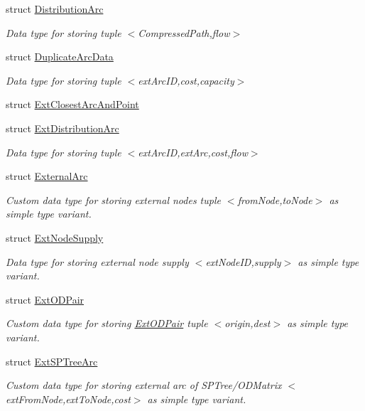 \begin{DoxyCompactItemize}
struct \hyperlink{structnetxpert_1_1data_1_1DistributionArc}{Distribution\+Arc}
\begin{DoxyCompactList}\small\item\em Data type for storing tuple $<$Compressed\+Path,flow$>$ \end{DoxyCompactList}\item 
struct \hyperlink{structnetxpert_1_1data_1_1DuplicateArcData}{Duplicate\+Arc\+Data}
\begin{DoxyCompactList}\small\item\em Data type for storing tuple $<$ext\+Arc\+ID,cost,capacity$>$ \end{DoxyCompactList}\item 
struct \hyperlink{structnetxpert_1_1data_1_1ExtClosestArcAndPoint}{Ext\+Closest\+Arc\+And\+Point}
\item 
struct \hyperlink{structnetxpert_1_1data_1_1ExtDistributionArc}{Ext\+Distribution\+Arc}
\begin{DoxyCompactList}\small\item\em Data type for storing tuple $<$ext\+Arc\+ID,ext\+Arc,cost,flow$>$ \end{DoxyCompactList}\item 
struct \hyperlink{structnetxpert_1_1data_1_1ExternalArc}{External\+Arc}
\begin{DoxyCompactList}\small\item\em Custom data type for storing external nodes tuple $<$from\+Node,to\+Node$>$ as simple type variant. \end{DoxyCompactList}\item 
struct \hyperlink{structnetxpert_1_1data_1_1ExtNodeSupply}{Ext\+Node\+Supply}
\begin{DoxyCompactList}\small\item\em Data type for storing external node supply $<$ext\+Node\+ID,supply$>$ as simple type variant. \end{DoxyCompactList}\item 
struct \hyperlink{structnetxpert_1_1data_1_1ExtODPair}{Ext\+O\+D\+Pair}
\begin{DoxyCompactList}\small\item\em Custom data type for storing \hyperlink{structnetxpert_1_1data_1_1ExtODPair}{Ext\+O\+D\+Pair} tuple $<$origin,dest$>$ as simple type variant. \end{DoxyCompactList}\item 
struct \hyperlink{structnetxpert_1_1data_1_1ExtSPTreeArc}{Ext\+S\+P\+Tree\+Arc}
\begin{DoxyCompactList}\small\item\em Custom data type for storing external arc of S\+P\+Tree/\+O\+D\+Matrix $<$ext\+From\+Node,ext\+To\+Node,cost$>$ as simple type variant. \end{DoxyCompactList}\item 

\end{DoxyCompactItemize}
